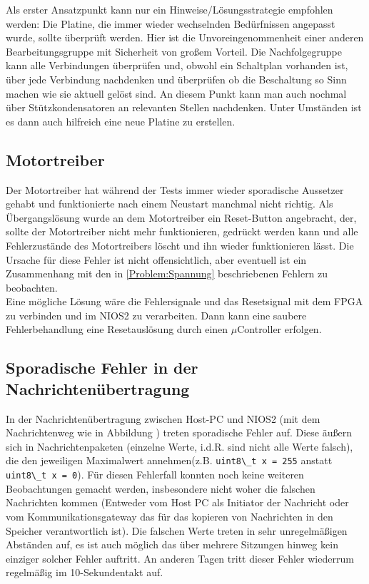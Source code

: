 Als erster Ansatzpunkt kann nur ein Hinweise/Lösungsstrategie empfohlen werden: Die Platine, die immer wieder wechselnden Bedürfnissen angepasst wurde, sollte überprüft werden. Hier ist die Unvoreingenommenheit einer anderen Bearbeitungsgruppe mit Sicherheit von großem Vorteil. Die Nachfolgegruppe kann alle Verbindungen überprüfen und, obwohl ein Schaltplan vorhanden ist, über jede Verbindung nachdenken und überprüfen ob die Beschaltung so Sinn machen wie sie aktuell gelöst sind. An diesem Punkt kann man auch nochmal über Stützkondensatoren an relevanten Stellen nachdenken. Unter Umständen ist es dann auch hilfreich eine neue Platine zu erstellen.

\subsection{Motortreiber}
Der Motortreiber hat während der Tests immer wieder sporadische Aussetzer gehabt und funktionierte nach einem Neustart manchmal nicht richtig. Als Übergangslösung wurde an dem Motortreiber ein Reset-Button angebracht, der, sollte der Motortreiber nicht mehr funktionieren, gedrückt werden kann und alle Fehlerzustände des Motortreibers löscht und ihn wieder funktionieren lässt.
Die Ursache für diese Fehler ist nicht offensichtlich, aber eventuell ist ein Zusammenhang mit den in \ref{Problem:Spannung} beschriebenen Fehlern zu beobachten.\\
Eine mögliche Lösung wäre die Fehlersignale und das Resetsignal mit dem \ac{FPGA} zu verbinden und im NIOS2 zu verarbeiten. Dann kann eine saubere Fehlerbehandlung eine Resetauslösung durch einen $\mu$Controller erfolgen.

\subsection{Sporadische Fehler in der Nachrichtenübertragung}
In der Nachrichtenübertragung zwischen Host-PC und NIOS2 (mit dem Nachrichtenweg wie in Abbildung ) treten sporadische Fehler auf. Diese äußern sich in Nachrichtenpaketen (einzelne Werte, i.d.R. sind nicht alle Werte falsch), die den jeweiligen Maximalwert annehmen(z.B. \lstinline|uint8\_t x = 255| anstatt \lstinline|uint8\_t x = 0|). Für diesen Fehlerfall konnten noch keine weiteren Beobachtungen gemacht werden, insbesondere nicht woher die falschen Nachrichten kommen (Entweder vom Host PC als Initiator der Nachricht oder vom Kommunikationsgateway das für das kopieren von Nachrichten in den Speicher verantwortlich ist). Die falschen Werte treten in sehr unregelmäßigen Abständen auf, es ist auch möglich das über mehrere Sitzungen hinweg kein einziger solcher Fehler auftritt. An anderen Tagen tritt dieser Fehler wiederrum regelmäßig im 10-Sekundentakt auf.

